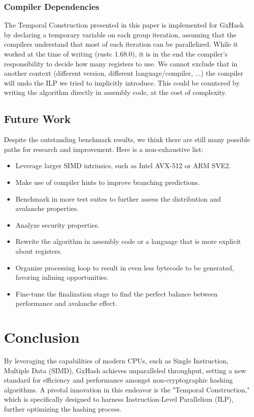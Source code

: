 \documentclass[10pt]{article}
\begin{document}
\subsubsection{Compiler Dependencies} 
The Temporal Construction presented in this paper is implemented for GxHash by declaring a temporary variable on each group iteration, assuming that the compilers understand that most of each iteration can be parallelized. While it worked at the time of writing (rustc 1.68.0), it is in the end the compiler's responsibility to decide how many registers to use. We cannot exclude that in another context (different version, different language/compiler, ...) the compiler will undo the ILP we tried to implicitly introduce. This could be countered by writing the algorithm directly in assembly code, at the cost of complexity.

\subsection{Future Work}
Despite the outstanding benchmark results, we think there are still many possible paths for research and improvement. Here is a non-exhaustive list:
\begin{itemize}
    \item Leverage larger SIMD intrinsics, such as Intel AVX-512 or ARM SVE2.
    \item Make use of compiler hints to improve branching predictions.
    \item Benchmark in more test suites to further assess the distribution and avalanche properties.
    \item Analyze security properties.
    \item Rewrite the algorithm in assembly code or a language that is more explicit about registers.
    \item Organize processing loop to result in even less bytecode to be generated, favoring inlining opportunities.
    \item Fine-tune the finalization stage to find the perfect balance between performance and avalanche effect.
\end{itemize}

\clearpage
\section{Conclusion}

By leveraging the capabilities of modern CPUs, such as Single Instruction, Multiple Data (SIMD), GxHash achieves unparalleled throughput, setting a new standard for efficiency and performance amongst non-cryptographic hashing algorithms. A pivotal innovation in this endeavor is the "Temporal Construction," which is specifically designed to harness Instruction-Level Parallelism (ILP), further optimizing the hashing process.
\end{document}
